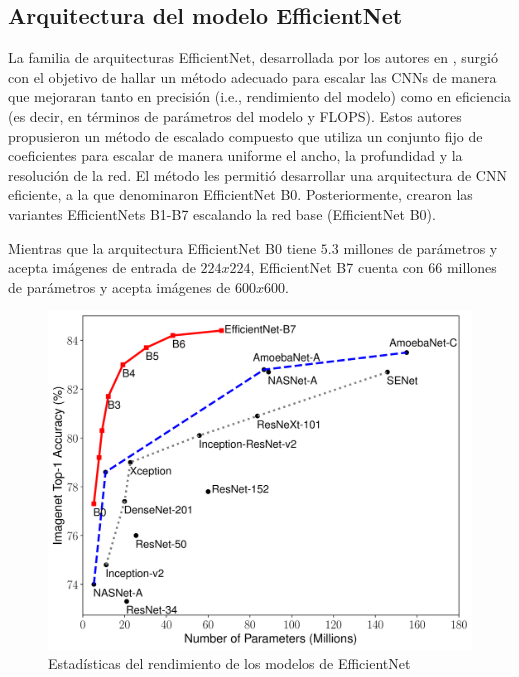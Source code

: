 \subsection{Arquitectura del modelo EfficientNet}

La familia de arquitecturas EfficientNet, desarrollada por los autores en , surgió con el objetivo de hallar un método adecuado para escalar las CNNs de manera que mejoraran tanto en precisión (i.e., rendimiento del modelo) como en eficiencia (es decir, en términos de parámetros del modelo y FLOPS). Estos autores propusieron un método de escalado compuesto que utiliza un conjunto fijo de coeficientes para escalar de manera uniforme el ancho, la profundidad y la resolución de la red. El método les permitió desarrollar una arquitectura de CNN eficiente, a la que denominaron EfficientNet B0. Posteriormente, crearon las variantes EfficientNets B1-B7 escalando la red base (EfficientNet B0).

Mientras que la arquitectura EfficientNet B0 tiene $5.3$ millones de parámetros y acepta imágenes de entrada de $224x224$, EfficientNet B7 cuenta con $66$ millones de parámetros y acepta imágenes de $600x600$. 

\begin{figure}[ht]%
   \begin{center}
   \includegraphics[width=1\textwidth]{./Graphics/efficientnet_performance.png}
   \caption{Estadísticas del rendimiento de los modelos de EfficientNet}
   \label{fig:efficientnet_performance}
   \end{center}
   \end{figure}

